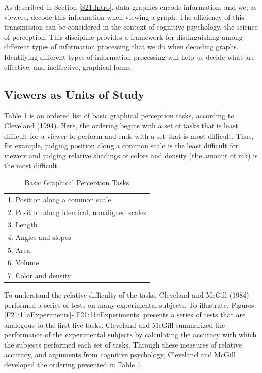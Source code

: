 As described in Section \ref{S21:Intro}, data graphics encode
information, and we, as viewers, decode this information when
viewing a graph. The efficiency of this transmission can be
considered in the context of cognitive psychology, the science of
perception. This discipline provides a framework for distinguishing
among different types of information processing that we do when
decoding graphs. Identifying different types of information
processing will help us decide what are effective, and ineffective,
graphical forms.


\subsection{Viewers as Units of Study}

Table \ref{T21:GraphPerception} is an ordered list of basic
graphical perception tasks, according to Cleveland (1994). Here, the
ordering begins with a set of tasks that is least difficult for a
viewer to perform and ends with a set that is most difficult. Thus,
for example, judging position along a common scale is the least
difficult for viewers and judging relative shadings of colors and
density (the amount of ink) is the most difficult.



\begin{table}[h]
\caption{\label{T21:GraphPerception} Basic Graphical Perception
Tasks}
\begin{tabular}{l}\hline
1. Position along a common scale \\
2. Position along identical, nonaligned scales \\
3. Length \\
4. Angles and slopes \\
5. Area \\
6. Volume \\
7. Color and density \\\hline
\end{tabular}
\end{table}



To understand the relative difficulty of the tasks, Cleveland and
McGill (1984) performed a series of tests on many experimental
subjects. To illustrate, Figures
\ref{F21:11aExperiments}-\ref{F21:11cExperiments} presents a series
of tests that are analogous to the first five tasks. Cleveland and
McGill summarized the performance of the experimental subjects by
calculating the accuracy with which the subjects performed each set
of tasks. Through these measures of relative accuracy, and arguments
from cognitive psychology, Cleveland and McGill developed the
ordering presented in Table \ref{T21:GraphPerception}.


